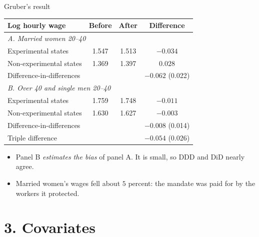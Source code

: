 \documentclass[
  11pt,
  ignorenonframetext,
  aspectratio=169,
]{beamer}
\providecommand{\tightlist}{%
  \setlength{\itemsep}{0pt}\setlength{\parskip}{0pt}}
\begin{document}
\begin{frame}{Gruber's result}
\protect{}\label{grubers-result}
\begin{center}\scriptsize
\begin{tabular}{lccc}
\toprule
Log hourly wage & Before & After & Difference \\
\midrule
\multicolumn{4}{l}{\emph{A. Married women 20--40}} \\
Experimental states & 1.547 & 1.513 & $-0.034$ \\
Non-experimental states & 1.369 & 1.397 & $0.028$ \\
Difference-in-differences & & & $\mathbf{-0.062}$ (0.022) \\
\midrule
\multicolumn{4}{l}{\emph{B. Over 40 and single men 20--40}} \\
Experimental states & 1.759 & 1.748 & $-0.011$ \\
Non-experimental states & 1.630 & 1.627 & $-0.003$ \\
Difference-in-differences & & & $\mathbf{-0.008}$ (0.014) \\
\midrule
Triple difference & & & $\mathbf{-0.054}$ (0.026) \\
\bottomrule
\end{tabular}
\end{center}

\begin{itemize}
\tightlist
\item
  Panel B \emph{estimates the bias} of panel A. It is small, so DDD and
  DiD nearly agree.
\item
  Married women's wages fell about \(5\) percent: the mandate was paid
  for by the workers it protected.
\end{itemize}
\end{frame}

\section{3. Covariates}\label{covariates}
\end{document}
